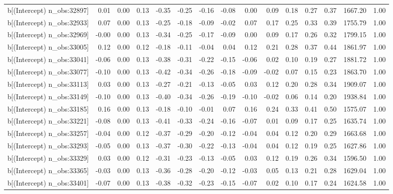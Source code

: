 \begin{table}[ht]
\begin{tabular}{rrrrrrrrrrrrrrr}
  b[(Intercept) n\_obs:32897] & 0.01 & 0.00 & 0.13 & -0.35 & -0.25 & -0.16 & -0.08 & 0.00 & 0.09 & 0.18 & 0.27 & 0.37 & 1667.20 & 1.00 \\ 
  b[(Intercept) n\_obs:32933] & 0.07 & 0.00 & 0.13 & -0.25 & -0.18 & -0.09 & -0.02 & 0.07 & 0.17 & 0.25 & 0.33 & 0.39 & 1755.79 & 1.00 \\ 
  b[(Intercept) n\_obs:32969] & -0.00 & 0.00 & 0.13 & -0.34 & -0.25 & -0.17 & -0.09 & 0.00 & 0.09 & 0.17 & 0.26 & 0.32 & 1799.15 & 1.00 \\ 
  b[(Intercept) n\_obs:33005] & 0.12 & 0.00 & 0.12 & -0.18 & -0.11 & -0.04 & 0.04 & 0.12 & 0.21 & 0.28 & 0.37 & 0.44 & 1861.97 & 1.00 \\ 
  b[(Intercept) n\_obs:33041] & -0.06 & 0.00 & 0.13 & -0.38 & -0.31 & -0.22 & -0.15 & -0.06 & 0.02 & 0.10 & 0.19 & 0.27 & 1881.72 & 1.00 \\ 
  b[(Intercept) n\_obs:33077] & -0.10 & 0.00 & 0.13 & -0.42 & -0.34 & -0.26 & -0.18 & -0.09 & -0.02 & 0.07 & 0.15 & 0.23 & 1863.70 & 1.00 \\ 
  b[(Intercept) n\_obs:33113] & 0.03 & 0.00 & 0.13 & -0.27 & -0.21 & -0.13 & -0.05 & 0.03 & 0.12 & 0.20 & 0.28 & 0.34 & 1909.07 & 1.00 \\ 
  b[(Intercept) n\_obs:33149] & -0.10 & 0.00 & 0.13 & -0.40 & -0.34 & -0.26 & -0.19 & -0.10 & -0.02 & 0.06 & 0.14 & 0.20 & 1938.84 & 1.00 \\ 
  b[(Intercept) n\_obs:33185] & 0.16 & 0.00 & 0.13 & -0.18 & -0.10 & -0.01 & 0.07 & 0.16 & 0.24 & 0.33 & 0.41 & 0.50 & 1575.07 & 1.00 \\ 
  b[(Intercept) n\_obs:33221] & -0.08 & 0.00 & 0.13 & -0.41 & -0.33 & -0.24 & -0.16 & -0.07 & 0.01 & 0.09 & 0.17 & 0.25 & 1635.74 & 1.00 \\ 
  b[(Intercept) n\_obs:33257] & -0.04 & 0.00 & 0.12 & -0.37 & -0.29 & -0.20 & -0.12 & -0.04 & 0.04 & 0.12 & 0.20 & 0.29 & 1663.68 & 1.00 \\ 
  b[(Intercept) n\_obs:33293] & -0.05 & 0.00 & 0.13 & -0.37 & -0.30 & -0.22 & -0.13 & -0.04 & 0.04 & 0.12 & 0.19 & 0.25 & 1627.86 & 1.00 \\ 
  b[(Intercept) n\_obs:33329] & 0.03 & 0.00 & 0.12 & -0.31 & -0.23 & -0.13 & -0.05 & 0.03 & 0.12 & 0.19 & 0.26 & 0.34 & 1596.50 & 1.00 \\ 
  b[(Intercept) n\_obs:33365] & -0.03 & 0.00 & 0.13 & -0.36 & -0.28 & -0.20 & -0.12 & -0.03 & 0.05 & 0.13 & 0.21 & 0.28 & 1629.04 & 1.00 \\ 
  b[(Intercept) n\_obs:33401] & -0.07 & 0.00 & 0.13 & -0.38 & -0.32 & -0.23 & -0.15 & -0.07 & 0.02 & 0.10 & 0.17 & 0.24 & 1624.58 & 1.00 \\ 

\end{tabular}
\end{table}
